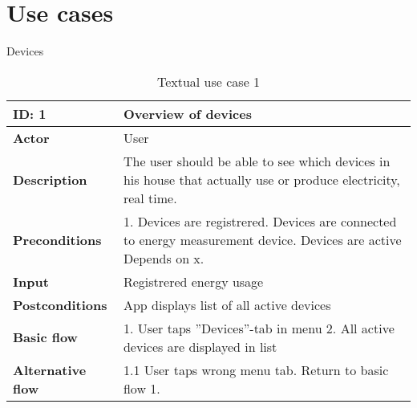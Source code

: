 \chapter{Use cases}
Devices

\begin{table}[H]
\begin{tabular}{|l|p{11.7cm}|}
\hline
\textbf{ID:} 1&\textbf{Overview of devices}\\\hline
\textbf{Actor} &User\\\hline
\textbf{Description}&
The user should be able to see which devices in his house that actually use or produce electricity, real time.\\\hline
\textbf{Preconditions}&
1. Devices are registrered\newline
2. Devices are connected to energy measurement device\newline
3. Devices are active\newline
Depends on x.\\\hline
\textbf{Input}&
Registrered energy usage\\\hline
\textbf{Postconditions}& App displays list of all active devices\\\hline
\textbf{Basic flow}&
1. User taps ''Devices''-tab in menu
2. All active devices are displayed in list\\\hline
\textbf{Alternative flow}&
1.1 User taps wrong menu tab. Return to basic flow 1.\\\hline
\end{tabular}
\caption{Textual use case 1}
\end{table}


